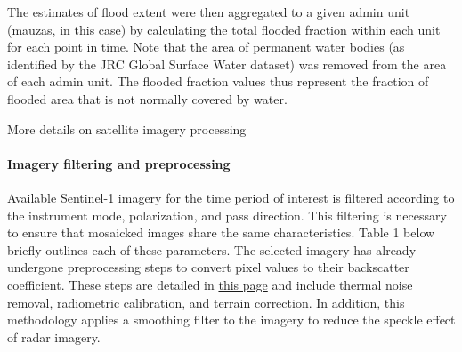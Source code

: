 \documentclass[
]{article}
\begin{document}
The estimates of flood extent were then aggregated to a given admin unit
(mauzas, in this case) by calculating the total flooded fraction within
each unit for each point in time. Note that the area of permanent water
bodies (as identified by the JRC Global Surface Water dataset) was
removed from the area of each admin unit. The flooded fraction values
thus represent the fraction of flooded area that is not normally covered
by water.

More details on satellite imagery processing

\hypertarget{imagery-filtering-and-preprocessing}{%
\paragraph{Imagery filtering and
preprocessing}\label{imagery-filtering-and-preprocessing}}

Available Sentinel-1 imagery for the time period of interest is filtered
according to the instrument mode, polarization, and pass direction. This
filtering is necessary to ensure that mosaicked images share the same
characteristics. Table 1 below briefly outlines each of these
parameters. The selected imagery has already undergone preprocessing
steps to convert pixel values to their backscatter coefficient. These
steps are detailed in
\href{https://developers.google.com/earth-engine/guides/sentinel1}{this
page} and include thermal noise removal, radiometric calibration, and
terrain correction. In addition, this methodology applies a smoothing
filter to the imagery to reduce the speckle effect of radar imagery.
\end{document}

